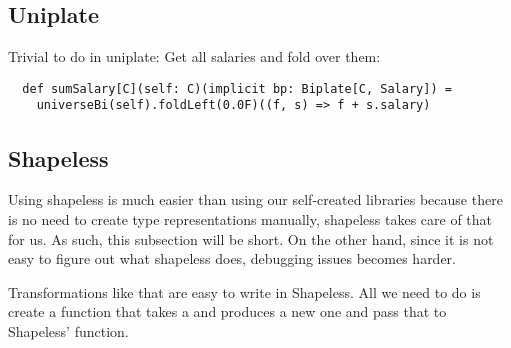 \subsection{Uniplate}


\begin{example}
 Trivial to do in uniplate: Get all salaries and fold over them:
\begin{lstlisting}
  def sumSalary[C](self: C)(implicit bp: Biplate[C, Salary]) =
    universeBi(self).foldLeft(0.0F)((f, s) => f + s.salary)
\end{lstlisting}

\end{example}

\begin{example}
\end{example}


\subsection{Shapeless}

Using shapeless is much easier than using our self-created libraries because
there is no need to create type representations manually, shapeless takes care
of that for us. As such, this subsection will be short. On the other hand, since
it is not easy to figure out what shapeless does, debugging issues becomes
harder.

\begin{example}
\end{example}

\begin{example}

Transformations like that are easy to write in Shapeless. All we need to do
is create a function that takes a  and produces a new one and pass
that to Shapeless'  function.



\end{example}
